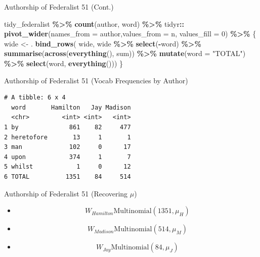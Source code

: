 \documentclass[
  ignorenonframetext,
  aspectratio=169]{beamer}
\newenvironment{Shaded}{\begin{snugshade}}{\end{snugshade}}
\newcommand{\AttributeTok}[1]{\textcolor[rgb]{0.13,0.29,0.53}{#1}}
\newcommand{\DecValTok}[1]{\textcolor[rgb]{0.00,0.00,0.81}{#1}}
\newcommand{\FunctionTok}[1]{\textcolor[rgb]{0.13,0.29,0.53}{\textbf{#1}}}
\newcommand{\NormalTok}[1]{#1}
\newcommand{\OtherTok}[1]{\textcolor[rgb]{0.56,0.35,0.01}{#1}}
\newcommand{\SpecialCharTok}[1]{\textcolor[rgb]{0.81,0.36,0.00}{\textbf{#1}}}
\newcommand{\StringTok}[1]{\textcolor[rgb]{0.31,0.60,0.02}{#1}}
\begin{document}
\begin{frame}[fragile]{Authorship of Federalist 51 (Cont.)}
\label{authorship-of-federalist-51-cont.}
\scriptsize

\begin{Shaded}
\begin{Highlighting}[]
\NormalTok{tidy\_federalist }\SpecialCharTok{\%\textgreater{}\%}
  \FunctionTok{count}\NormalTok{(author, word) }\SpecialCharTok{\%\textgreater{}\%}          
\NormalTok{  tidyr}\SpecialCharTok{::} \FunctionTok{pivot\_wider}\NormalTok{(}\AttributeTok{names\_from =}\NormalTok{ author,}\AttributeTok{values\_from =}\NormalTok{ n, }\AttributeTok{values\_fill =} \DecValTok{0}\NormalTok{) }\SpecialCharTok{\%\textgreater{}\%}
\NormalTok{  \{ }
\NormalTok{    wide }\OtherTok{\textless{}{-}}\NormalTok{ .                      }
    \FunctionTok{bind\_rows}\NormalTok{(}
\NormalTok{      wide,}
\NormalTok{      wide }\SpecialCharTok{\%\textgreater{}\%}
        \FunctionTok{select}\NormalTok{(}\SpecialCharTok{{-}}\NormalTok{word) }\SpecialCharTok{\%\textgreater{}\%}
        \FunctionTok{summarise}\NormalTok{(}\FunctionTok{across}\NormalTok{(}\FunctionTok{everything}\NormalTok{(), sum)) }\SpecialCharTok{\%\textgreater{}\%}
        \FunctionTok{mutate}\NormalTok{(}\AttributeTok{word =} \StringTok{"TOTAL"}\NormalTok{) }\SpecialCharTok{\%\textgreater{}\%}
        \FunctionTok{select}\NormalTok{(word, }\FunctionTok{everything}\NormalTok{()))}
\NormalTok{  \} }
\end{Highlighting}
\end{Shaded}
\end{frame}

\begin{frame}[fragile]{Authorship of Federalist 51 (Vocab Frequencies by
Author)}
\label{authorship-of-federalist-51-vocab-frequencies-by-author}
\begin{verbatim}
# A tibble: 6 x 4
  word       Hamilton   Jay Madison
  <chr>         <int> <int>   <int>
1 by              861    82     477
2 heretofore       13     1       1
3 man             102     0      17
4 upon            374     1       7
5 whilst            1     0      12
6 TOTAL          1351    84     514
\end{verbatim}
\end{frame}

\begin{frame}{Authorship of Federalist 51 (Recovering \(\mu\))}
\label{authorship-of-federalist-51-recovering-mu}
\begin{itemize}
\item[] $$W_{Hamilton}\text{Multinomial}(1351, \mu_{H})$$ \par \vspace{2.5mm}
\item[] $$W_{Madison}\text{Multinomial}(514, \mu_{M})$$ \par \vspace{2.5mm}
\item[] $$W_{Jay}\text{Multinomial}(84, \mu_{J})$$
\end{itemize}
\end{frame}
\end{document}
